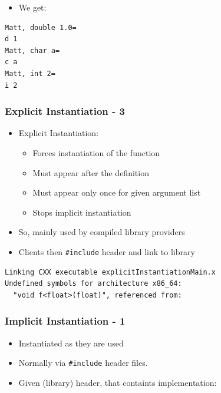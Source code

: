 \begin{itemize}
\itemsep1pt\parskip0pt
\item
  We get:
\end{itemize}

\begin{verbatim}
Matt, double 1.0=
d 1
Matt, char a=
c a
Matt, int 2=
i 2
\end{verbatim}

\subsubsection{Explicit Instantiation -
3}\label{explicit-instantiation---3}

\begin{itemize}
\itemsep1pt\parskip0pt
\item
  Explicit Instantiation:

  \begin{itemize}
  \itemsep1pt\parskip0pt
  \item
    Forces instantiation of the function
  \item
    Must appear after the definition
  \item
    Must appear only once for given argument list
  \item
    Stops implicit instantiation
  \end{itemize}
\item
  So, mainly used by compiled library providers
\item
  Clients then \texttt{\#include} header and link to library
\end{itemize}

\begin{verbatim}
Linking CXX executable explicitInstantiationMain.x
Undefined symbols for architecture x86_64:
  "void f<float>(float)", referenced from:
\end{verbatim}

\subsubsection{Implicit Instantiation -
1}\label{implicit-instantiation---1}

\begin{itemize}
\item
  Instantiated as they are used
\item
  Normally via \texttt{\#include} header files.
\item
  Given (library) header, that containts implementation:
\end{itemize}

